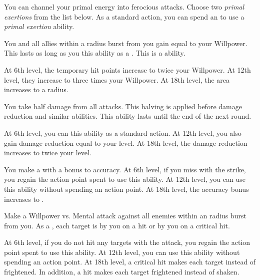         You can channel your primal energy into ferocious attacks.
        Choose two \textit{primal exertions} from the list below.
        As a standard action, you can spend an  to use a \textit{primal exertion} ability.
        {
             You and all allies within a \arealarge radius burst from you gain  equal to your Willpower.
            This lasts as long as you  this ability as a .
            This is a  ability.
            \par At 6th level, the temporary hit points increase to twice your Willpower.
            At 12th level, they increase to three times your Willpower.
            At 18th level, the area increases to a \areahuge radius.

             You take half damage from all attacks.
            This halving is applied before damage reduction and similar abilities.
            This ability lasts until the end of the next round.
            \par At 6th level, you can  this ability as a standard action.
            At 12th level, you also gain damage reduction equal to your level.
            At 18th level, the damage reduction increases to twice your level.

             You make a  with a  bonus to accuracy.
            At 6th level, if you miss with the strike, you regain the action point spent to use this ability.
            At 12th level, you can use this ability without spending an action point.
            At 18th level, the accuracy bonus increases to .

            Make a Willpower vs. Mental attack against all enemies within an \arealarge radius burst from you.
            As a , each target is \shaken by you on a hit or \frightened by you on a critical hit.
            \par At 6th level, if you do not hit any targets with the attack, you regain the action point spent to use this ability.
            At 12th level, you can use this ability without spending an action point.
            At 18th level, a critical hit makes each target \panicked instead of frightened.
            In addition, a hit makes each target frightened instead of shaken.

}

